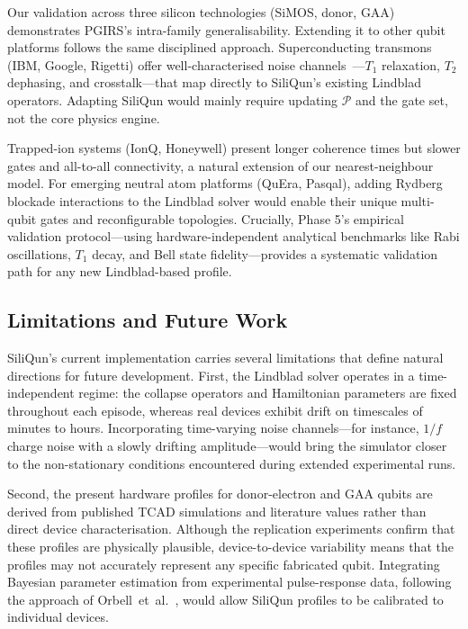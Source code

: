 Our validation across three silicon technologies (SiMOS, donor, GAA) demonstrates PGIRS's intra-family generalisability. Extending it to other qubit platforms follows the same disciplined approach. Superconducting transmons (IBM, Google, Rigetti) offer well-characterised noise channels~\cite{Krantz2019}—$T_1$ relaxation, $T_2$ dephasing, and crosstalk—that map directly to SiliQun's existing Lindblad operators. Adapting SiliQun would mainly require updating $\mathcal{P}$ and the gate set, not the core physics engine. 

Trapped-ion systems (IonQ, Honeywell) present longer coherence times but slower gates and all-to-all connectivity, a natural extension of our nearest-neighbour model. For emerging neutral atom platforms (QuEra, Pasqal), adding Rydberg blockade interactions to the Lindblad solver would enable their unique multi-qubit gates and reconfigurable topologies. Crucially, Phase 5's empirical validation protocol—using hardware-independent analytical benchmarks like Rabi oscillations, $T_1$ decay, and Bell state fidelity—provides a systematic validation path for any new Lindblad-based profile.

\subsection{Limitations and Future Work}
\label{subsec:limitations}

SiliQun's current implementation carries several limitations that define natural directions for future development. First, the Lindblad solver operates in a time-independent regime: the collapse operators and Hamiltonian parameters are fixed throughout each episode, whereas real devices exhibit drift on timescales of minutes to hours. Incorporating time-varying noise channels—for instance, $1/f$ charge noise with a slowly drifting amplitude—would bring the simulator closer to the non-stationary conditions encountered during extended experimental runs.

Second, the present hardware profiles for donor-electron and GAA qubits are derived from published TCAD simulations and literature values rather than direct device characterisation. Although the replication experiments confirm that these profiles are physically plausible, device-to-device variability means that the profiles may not accurately represent any specific fabricated qubit. Integrating Bayesian parameter estimation from experimental pulse-response data, following the approach of Orbell~et~al.~\cite{Orbell2024}, would allow SiliQun profiles to be calibrated to individual devices.

